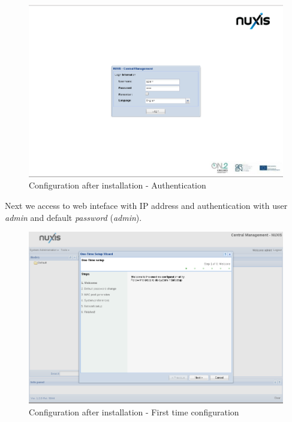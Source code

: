 \begin{figure}[H]
	\begin{center}
    \includegraphics[scale=0.4]{screenshots/install/nuxis/nuxis_enterprise_pos_install_21.png}
    \caption{Configuration after installation - Authentication}
	\label{fig:installation_enterprise_pos_03}
	\end{center}
\end{figure}

Next we access to web inteface with IP address and authentication with user \emph{admin} and default \emph{password} (\emph{admin}).

\begin{figure}[H]
	\begin{center}
    \includegraphics[scale=0.4]{screenshots/install/nuxis/nuxis_enterprise_wiz_install_22.png}
    \caption{Configuration after installation - First time configuration}
	\label{fig:installation_enterprise_wiz_01}
	\end{center}
\end{figure}

